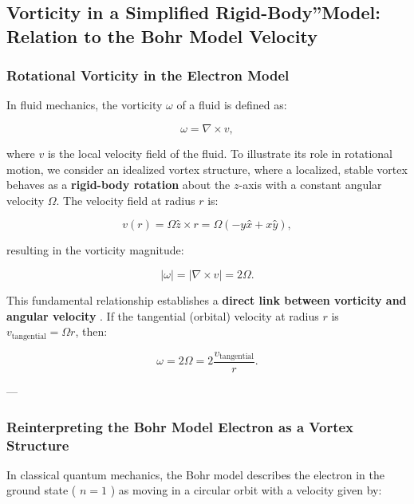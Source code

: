 

\subsection{Vorticity in a Simplified \grqq Rigid-Body\textquotedblright Model: Relation to the Bohr Model Velocity}

\subsubsection*{Rotational Vorticity in the Electron Model}

In fluid mechanics, the vorticity \( \omega \) of a fluid is defined as:

\begin{equation*}
    \omega = \nabla \times v,
\end{equation*}

where \( v \) is the local velocity field of the fluid. To illustrate its role in rotational motion, we consider an idealized vortex structure, where a localized, stable vortex behaves as a \textbf{rigid-body rotation} about the \( z \)-axis with a constant angular velocity \( \Omega \). The velocity field at radius \( r \) is:

\begin{equation*}
    v(r) = \Omega ẑ \times r = \Omega(-yx̂ + xŷ),
\end{equation*}

resulting in the vorticity magnitude:

\begin{equation*}
    |\omega| = |\nabla \times v| = 2\Omega.
\end{equation*}

This fundamental relationship establishes a \textbf{direct link between vorticity and angular velocity} \cite{lamb_hydrodynamics,feynman_qed}. If the tangential (orbital) velocity at radius \( r \) is \( v_\text{tangential} = \Omega r \), then:

\begin{equation*}
    \omega = 2\Omega = 2\frac{v_\text{tangential}}{r}.
\end{equation*}

---

\subsubsection*{Reinterpreting the Bohr Model Electron as a Vortex Structure}

In classical quantum mechanics, the Bohr model describes the electron in the ground state ( \( n = 1 \) ) as moving in a circular orbit with a velocity given by:

